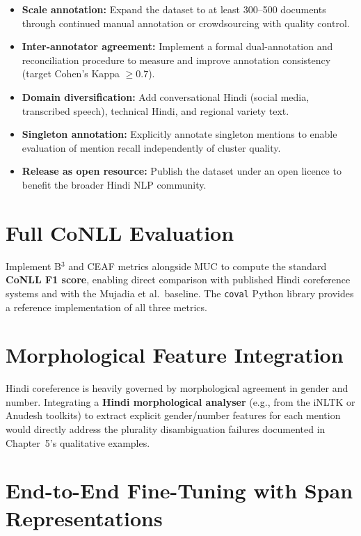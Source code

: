 \documentclass[12pt,a4paper]{report}
\begin{document}
\begin{itemize}
    \item \textbf{Scale annotation:} Expand the dataset to at least 300--500 documents through continued manual annotation or crowdsourcing with quality control.
    \item \textbf{Inter-annotator agreement:} Implement a formal dual-annotation and reconciliation procedure to measure and improve annotation consistency (target Cohen's Kappa $\geq 0.7$).
    \item \textbf{Domain diversification:} Add conversational Hindi (social media, transcribed speech), technical Hindi, and regional variety text.
    \item \textbf{Singleton annotation:} Explicitly annotate singleton mentions to enable evaluation of mention recall independently of cluster quality.
    \item \textbf{Release as open resource:} Publish the dataset under an open licence to benefit the broader Hindi NLP community.
\end{itemize}

\section{Full CoNLL Evaluation}

Implement B$^3$ and CEAF metrics alongside MUC to compute the standard \textbf{CoNLL F1 score}, enabling direct comparison with published Hindi coreference systems and with the Mujadia et al.\ baseline. The \texttt{coval} Python library provides a reference implementation of all three metrics.

\section{Morphological Feature Integration}

Hindi coreference is heavily governed by morphological agreement in gender and number. Integrating a \textbf{Hindi morphological analyser} (e.g., from the iNLTK or Anudesh toolkits) to extract explicit gender/number features for each mention would directly address the plurality disambiguation failures documented in Chapter~5's qualitative examples.

\section{End-to-End Fine-Tuning with Span Representations}
\end{document}

